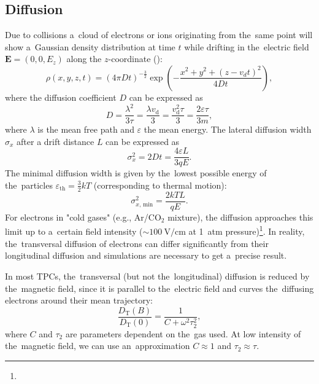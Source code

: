 		\subsection{Diffusion}
			Due to collisions a~cloud of electrons or ions originating from the~same point will show a~Gaussian density distribution at time $t$ while drifting in the~electric field $\mathbf{E} = (0,0,E_z)$ along the $z$\nobreakdash-coordinate ():
				\begin{equation}
					\rho(x,y,z,t) = (4\pi Dt)^{-\frac{3}{2}} \exp\left(-\frac{x^2+y^2+(z-v_dt)^2}{4Dt}\right),
				\end{equation}
			where the diffusion coefficient $D$ can be expressed as
				\begin{equation}
					D = \frac{\lambda^2}{3\tau} = \frac{\lambda v_\text{d}}{3} = \frac{v_\text{d}^2\tau}{3} = \frac{2\varepsilon\tau}{3m},
				\end{equation}
			where $\lambda$ is the mean free path and $\varepsilon$ the mean energy. The lateral diffusion width $\sigma_x$ after a drift distance $L$ can be expressed as
				\begin{equation}
					\sigma_x^2 = 2Dt = \frac{4\varepsilon L}{3qE}.
				\end{equation}
			The minimal diffusion width is given by the~lowest possible energy of the~particles $\varepsilon_\text{th} = \frac{3}{2}kT$ (corresponding to thermal motion):
				\begin{equation}
					\sigma_{x, \,\text{min}}^2 = \frac{2kTL}{qE}.
				\end{equation}
			For electrons in "cold gases" (e.g., Ar/CO$_2$ mixture), the diffusion approaches this limit up to a~certain field intensity ($\sim 100~\text{V}/\text{cm}$ at 1~atm pressure)\footnote{}. In reality, the~transversal diffusion of electrons can differ significantly from their longitudinal diffusion and simulations are necessary to get a~precise result.
			
			In most \ac{TPC}s, the~transversal (but not the~longitudinal) diffusion is reduced by the~magnetic field, since it is parallel to the~electric field and curves the~diffusing electrons around their mean trajectory:
				\begin{equation}
					\label{eq:difmag}
					\frac{D_\text{T}(B)}{D_\text{T}(0)} = \frac{1}{C+\omega^2\tau_2^2},
				\end{equation}
			where $C$ and $\tau_2$ are parameters dependent on the~gas used. At low intensity of the~magnetic field, we can use an~approximation $C\approx1$ and $\tau_2\approx\tau$.
	
